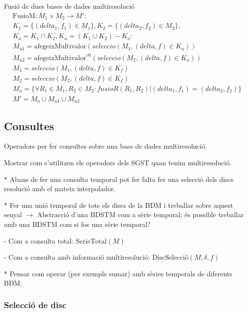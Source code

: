 Fusió de dues bases de dades multiresolució
\begin{gather*}
    \text{FusioM}: M_1 \times M_2 \longrightarrow M': \\
    K_1 = \{(delta_1,f_1) \in M_1\},K_2 = \{(delta_2,f_2) \in M_2\}, \\
    K_a = K_1 \cap K_2, K_u =  (K_1 \cup K_2) - K_a : \\
    M_{u1} =\text{afegeixMultivalor}(seleccio(M_1, (delta,f) \in K_u))\\
    M_{u2} =\text{afegeixMultivalor}^{v0} (seleccio(M_2, (delta,f) \in K_u))\\
    M_1 = seleccio(M_1, (delta,f) \in K_f) \\
    M_2 = seleccio(M_2, (delta,f) \in K_f) \\
    M_a = \{\forall R_1\in M_1,R_2\in M_2: fusioR(R_1,R_2) |
       (delta_1,f_1) = (delta_2,f_2) \} \\
    M' =  M_{a} \cup  M_{u1}  \cup  M_{u2}     
\end{gather*}






\subsection{Consultes}



Operadors per fer consultes sobre una base de dades multiresolució. 

Mostrar com s'utilitzen els operadors dels SGST quan tenim multiresolució.


* Abans de fer una consulta temporal pot fer falta fer una selecció dels discs resolució amb el mateix interpolador.

* Fer una unió temporal de tots els discs de la BDM i treballar sobre aquest senyal $\longrightarrow$ Abstracció d'una BDSTM com a sèrie temporal; és possible treballar amb una BDSTM com si fos una sèrie temporal?

  - Com a consulta total: $\text{SerieTotal}(M)$

  - Com a consulta amb informació multiresolució: $\text{DiscSelecció}(M,\delta,f)$

* Pensar com operar (per exemple sumar) amb sèries temporals de diferents BDM. 




\subsubsection{Selecció de disc}


